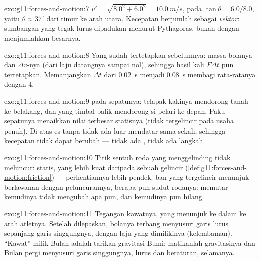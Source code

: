 \begin{solution}{exo:g11:forces-and-motion:7}
$v' = \sqrt{8.0^2 + 6.0^2} = \qty{10.0}{m/s}$, pada
$\tan\theta =
6.0/8.0$, yaitu $\theta \approx 37^\circ$ dari timur ke
arah utara. Kecepatan berjumlah sebagai \emph{vektor}: sumbangan yang
tegak lurus dipadukan menurut Pythagoras, bukan dengan menjumlahkan
besarnya.
\end{solution}

\begin{solution}{exo:g11:forces-and-motion:8}
Yang sudah tertetapkan sebelumnya: massa bolanya dan $\Delta v$-nya
(dari laju datangnya sampai nol), sehingga hasil kali $F\Delta t$ pun
tertetapkan. Memanjangkan $\Delta t$ dari \qty{0.02}{s} menjadi
\qty{0.08}{s} membagi  rata-ratanya dengan $4$.
\end{solution}

\begin{solution}{exo:g11:forces-and-motion:9}
  pada sepatunya: telapak kakinya mendorong
tanah ke belakang, dan  yang timbal balik mendorong si pelari
ke depan. Paku sepatunya menaikkan nilai terbesar  statisnya
(tidak tergelincir pada usaha penuh). Di atas es tanpa  tidak ada
 luar mendatar sama sekali, sehingga kecepatan  tidak
dapat berubah --- tidak ada , tidak ada langkah.
\end{solution}

\begin{solution}{exo:g11:forces-and-motion:10}
Titik sentuh roda yang menggelinding tidak meluncur:  statis,
yang lebih kuat daripada  sebuah gelincir
(\cref{def:g11:forces-and-motion:friction}) --- perhentiannya lebih
pendek.  ban yang tergelincir menunjuk berlawanan
dengan peluncurannya, berapa pun sudut rodanya: memutar kemudinya tidak
mengubah apa pun, dan kemudinya pun hilang.
\end{solution}

\begin{solution}{exo:g11:forces-and-motion:11}
Tegangan kawatnya, yang menunjuk ke dalam ke arah atletnya. Setelah
dilepaskan, bolanya terbang menyusuri garis lurus sepanjang garis
singgungnya, dengan laju yang dimilikinya (kelembaman). ``Kawat'' milik
Bulan adalah tarikan gravitasi Bumi; matikanlah gravitasinya dan Bulan
pergi menyusuri garis singgungnya, lurus dan beraturan, selamanya.
\end{solution}

